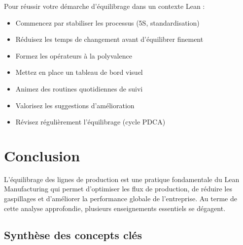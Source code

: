 \documentclass[12pt,a4paper]{article}
\newenvironment{conseil}
  {\begin{tcolorbox}[colback=green!5!white, colframe=green!50!black, title=\textbf{Conseil}]\small}
  {\end{tcolorbox}}
\begin{document}
\begin{center}
\begin{center}
\end{center}

\begin{conseil}
Pour réussir votre démarche d'équilibrage dans un contexte Lean :
\begin{itemize}
    \item Commencez par stabiliser les processus (5S, standardisation)
    \item Réduisez les temps de changement avant d'équilibrer finement
    \item Formez les opérateurs à la polyvalence
    \item Mettez en place un tableau de bord visuel
    \item Animez des routines quotidiennes de suivi
    \item Valorisez les suggestions d'amélioration
    \item Révisez régulièrement l'équilibrage (cycle PDCA)
\end{itemize}
\end{conseil}
\newpage

\section{Conclusion}

L'équilibrage des lignes de production est une pratique fondamentale du Lean Manufacturing qui permet d'optimiser les flux de production, de réduire les gaspillages et d'améliorer la performance globale de l'entreprise. Au terme de cette analyse approfondie, plusieurs enseignements essentiels se dégagent.

\subsection{Synthèse des concepts clés}


\end{center}
\end{document}
